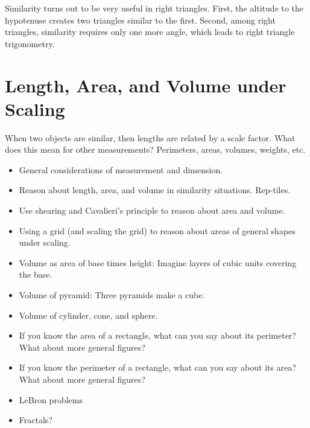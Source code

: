 Similarity turns out to be very useful in right triangles.  First, the altitude to the hypotenuse creates two triangles similar to the first.  Second, among right triangles, similarity requires only one more angle, which leads to right triangle trigonometry.  

\section{Length, Area, and Volume under Scaling}
When two objects are similar, then lengths are related by a scale factor.  What does this mean for other measurements?  Perimeters, areas, volumes, weights, etc.  

\begin{itemize}\itemsep-2pt
\item General considerations of measurement and dimension.  
\item Reason about length, area, and volume in similarity situations.  Rep-tiles.    
\item Use shearing and Cavalieri's principle to reason about area and volume.  
\item Using a grid (and scaling the grid) to reason about areas of general shapes under scaling.  
\item Volume as area of base times height:  Imagine layers of cubic units covering the base.
\item Volume of pyramid:  Three pyramids make a cube.  
\item Volume of cylinder, cone, and sphere.
\item If you know the area of a rectangle, what can you say about its perimeter?  What about more general figures?  
\item If you know the perimeter of a rectangle, what can you say about its area?  What about more general figures? 
\item LeBron problems
\item Fractals?  
\end{itemize}
